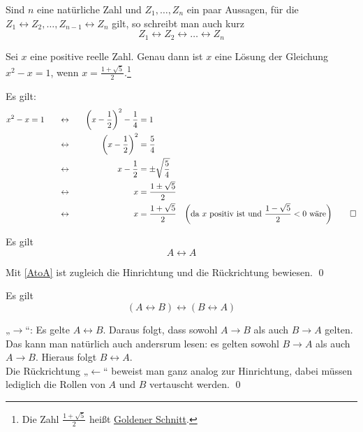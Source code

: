 \begin{bem}
Sind $n$ eine natürliche Zahl und $Z_1,\dots , Z_n$ ein paar Aussagen, für die $Z_1\leftrightarrow Z_2,\dots, Z_{n-1}\leftrightarrow Z_n$ gilt, so schreibt man auch kurz
   \[ Z_1\leftrightarrow Z_2 \leftrightarrow \ldots \leftrightarrow  Z_n\]
\end{bem}



\begin{bsp}
Sei $x$ eine positive reelle Zahl. Genau dann ist $x$ eine Lösung der Gleichung $x^2-x=1$, wenn $x= \frac{1+\sqrt{5}}{2}$.\footnote{ Die Zahl $\frac{1+\sqrt{5}}{2}$ heißt \href{https://de.wikipedia.org/wiki/Goldener_Schnitt}{Goldener Schnitt}.}
\end{bsp}
\begin{bew}
 Es gilt:
 \begin{align*}
  x^2-x& =1 \quad & \leftrightarrow&\quad& \left(x-\frac{1}{2}\right)^2 - \frac{1}{4} &= 1 \\
 && \leftrightarrow&\quad& \left(x-\frac{1}{2}\right)^2&=\frac{5}{4} \\
 && \leftrightarrow&\quad& x-\frac{1}{2} &= \pm \sqrt{\frac{5}{4}} \\
 && \leftrightarrow&\quad& x  &= \frac{1\pm \sqrt{5}}{2} \\
 && \leftrightarrow& \quad& x & = \frac{1+\sqrt{5}}{2} & \left(\text{da $x$ positiv ist und $\frac{1-\sqrt{5}}{2}<0$ wäre}\right) \qed
 \end{align*}
\end{bew}






\begin{sat}\label{AtotoA}
Es gilt
\[ A\leftrightarrow A \]
\end{sat}
\begin{bew}
Mit \cref{AtoA} ist zugleich die Hinrichtung und die Rückrichtung bewiesen. \qed
\end{bew}



\begin{sat}\label{komm:toto}
Es gilt
 \[ (A\leftrightarrow B)\leftrightarrow(B\leftrightarrow A) \]
\end{sat}
\begin{bew}[(*)]
 „$\to$“: Es gelte $A\leftrightarrow B$. Daraus folgt, dass sowohl $A\to B$ als auch $B\to A$ gelten. Das kann man natürlich auch andersrum lesen: es gelten sowohl $B\to A$ als auch $A\to B$. Hieraus folgt $B\leftrightarrow A$. \\
 Die Rückrichtung „$\leftarrow$“ beweist man ganz analog zur Hinrichtung, dabei müssen lediglich die Rollen von $A$ und $B$ vertauscht werden. \qed
\end{bew}





